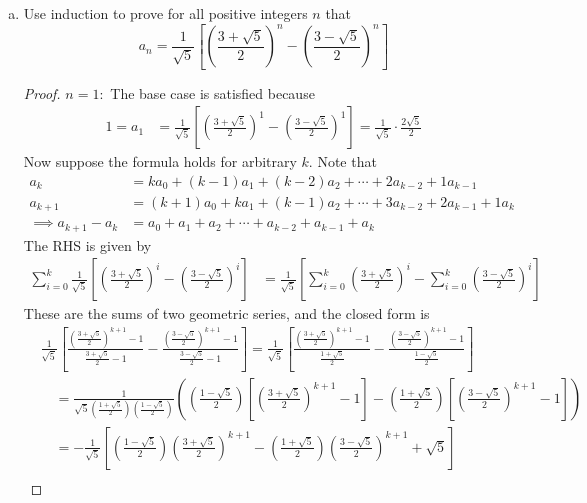 \documentclass{article}
\begin{document}
\begin{itemize}
\begin{enumerate}[(a)]
			\item Use induction to prove for all positive integers $n$ that
				\[a_n=\frac{1}{\sqrt{5}}\left[ \left( \frac{3+\sqrt{5}}{2} \right)^n-\left( \frac{3-\sqrt{5}}{2} \right)^n \right]\]
				\begin{proof}
					$n=1:$ The base case is satisfied because
					\begin{align*}
						1 = a_1 &= \frac{1}{\sqrt{5}}\left[ \left( \frac{3+\sqrt{5}}{2} \right)^1-\left( \frac{3-\sqrt{5}}{2} \right)^1 \right] = \frac{1}{\sqrt{5}}\cdot \frac{2\sqrt{5}}{2}
					\end{align*}
					Now suppose the formula holds for arbitrary $k.$ Note that
					\begin{align*}
						a_k &= ka_0+(k-1)a_1+(k-2)a_2+\cdots+2a_{k-2}+1a_{k-1} \\
						a_{k+1} &= (k+1)a_0+ka_1+(k-1)a_2+\cdots+3a_{k-2}+2a_{k-1}+1a_k \\
						\implies a_{k+1}-a_k &= a_0+a_1+a_2+\cdots+a_{k-2}+a_{k-1}+a_k
					\end{align*}
					The RHS is given by
					\begin{align*}
						\sum_{i=0}^{k} \frac{1}{\sqrt{5}}\left[ \left( \frac{3+\sqrt{5}}{2} \right)^i - \left( \frac{3-\sqrt{5}}{2} \right)^i \right] &= \frac{1}{\sqrt{5}}\left[\sum_{i=0}^{k} \left( \frac{3+\sqrt{5}}{2} \right)^i - \sum_{i=0}^{k} \left( \frac{3-\sqrt{5}}{2} \right)^i\right]
					\end{align*}
					These are the sums of two geometric series, and the closed form is
					\begin{align*}
						&\frac{1}{\sqrt{5}}\left[ \frac{\left( \frac{3+\sqrt{5}}{2} \right)^{k+1}-1}{\frac{3+\sqrt{5}}{2} - 1} - \frac{\left( \frac{3-\sqrt{5}}{2} \right)^{k+1}-1}{\frac{3-\sqrt{5}}{2} - 1} \right] = \frac{1}{\sqrt{5}}\left[ \frac{\left( \frac{3+\sqrt{5}}{2} \right)^{k+1}-1}{\frac{1+\sqrt{5}}{2}} - \frac{\left( \frac{3-\sqrt{5}}{2} \right)^{k+1}-1}{\frac{1-\sqrt{5}}{2}} \right] \\
						&\quad = \frac{1}{\sqrt{5}\left( \frac{1+\sqrt{5}}{2} \right)\left( \frac{1-\sqrt{5}}{2} \right)}\left( \left( \frac{1-\sqrt{5}}{2} \right)\left[ \left( \frac{3+\sqrt{5}}{2} \right)^{k+1}-1 \right] - \left( \frac{1+\sqrt{5}}{2}\right) \left[ \left( \frac{3-\sqrt{5}}{2} \right)^{k+1}-1 \right] \right) \\
						&\quad = -\frac{1}{\sqrt{5}}\left[ \left( \frac{1-\sqrt{5}}{2} \right) \left( \frac{3+\sqrt{5}}{2} \right)^{k+1}- \left( \frac{1+\sqrt{5}}{2} \right)\left( \frac{3-\sqrt{5}}{2} \right)^{k+1} + \sqrt{5} \right] \\

\end{align*}
\end{proof}
\end{enumerate}
\end{itemize}
\end{document}
